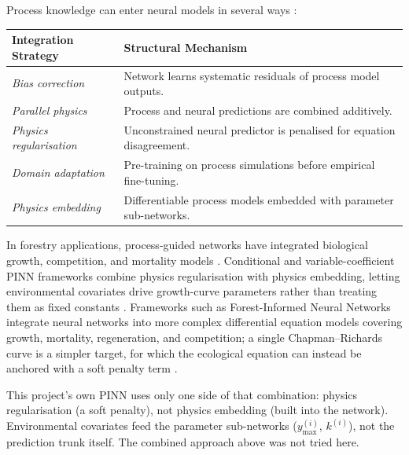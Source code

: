 Process knowledge can enter neural models in several ways \cite{wesselkamp2024Process_C4_NN}:
\begin{table}[ht]
\centering
\footnotesize
\begin{tabular}{ll}
\hline
\textbf{Integration Strategy} & \textbf{Structural Mechanism} \\
\hline
\emph{Bias correction} & Network learns systematic residuals of process model outputs. \\
\emph{Parallel physics} & Process and neural predictions are combined additively. \\
\emph{Physics regularisation} & Unconstrained neural predictor is penalised for equation disagreement. \\
\emph{Domain adaptation} & Pre-training on process simulations before empirical fine-tuning. \\
\emph{Physics embedding} & Differentiable process models embedded with parameter sub-networks. \\
\hline
\end{tabular}
\label{tab:pinn-strategies}
\end{table}

In forestry applications, process-guided networks have integrated biological growth, competition, and mortality models \cite{pichler2025Inferring_C4_NN}. Conditional and variable-coefficient PINN frameworks combine physics regularisation with physics embedding, letting environmental covariates drive growth-curve parameters rather than treating them as fixed constants \cite{kovacs2022Conditional_C4_NN, miao2023VCPINN_C4_NN, scolforo2013Dominant_C2_CR}. Frameworks such as Forest-Informed Neural Networks integrate neural networks into more complex differential equation models covering growth, mortality, regeneration, and competition; a single Chapman--Richards curve is a simpler target, for which the ecological equation can instead be anchored with a soft penalty term \cite{pichler2025Inferring_C4_NN}.

This project's own PINN uses only one side of that combination: physics regularisation (a soft penalty), not physics embedding (built into the network). Environmental covariates feed the parameter sub-networks ($y_{\max}^{(i)}$, $k^{(i)}$), not the prediction trunk itself. The combined approach above was not tried here.


